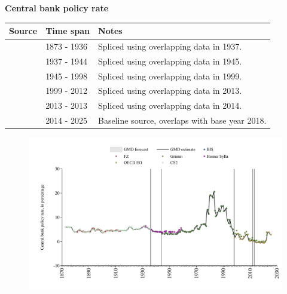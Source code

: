 \documentclass[12pt,a4paper,landscape]{article}
\begin{document}
\begin{adjustbox}{max totalsize={\paperwidth}{\paperheight},center}
\begin{minipage}[t][\textheight][t]{\textwidth}
\vspace*{0.5cm}
{}
\begin{center}
{\Large\bfseries Central bank policy rate}
\end{center}
\vspace{0.5cm}
\begin{table}[H]
\centering
\small
\begin{tabular}{|l|l|l|}
\hline
\textbf{Source} & \textbf{Time span} & \textbf{Notes} \\
\hline
\rowcolor{white}\cite{CS2_ESP}& 1873 - 1936 &Spliced using overlapping data in 1937. \\
\rowcolor{lightgray}\cite{Homer_Sylla}& 1937 - 1944 &Spliced using overlapping data in 1945. \\
\rowcolor{white}\cite{BIS}& 1945 - 1998 &Spliced using overlapping data in 1999. \\
\rowcolor{lightgray}\cite{OECD_EO}& 1999 - 2012 &Spliced using overlapping data in 2013. \\
\rowcolor{white}\cite{Grimm}& 2013 - 2013 &Spliced using overlapping data in 2014. \\
\rowcolor{lightgray}\cite{OECD_EO}& 2014 - 2025 &Baseline source, overlaps with base year 2018. \\
\hline
\end{tabular}
\end{table}
\begin{figure}[H]
\centering
\includegraphics[width=\textwidth,height=0.6\textheight,keepaspectratio]{graphs/ESP_cbrate.pdf}
\end{figure}
\end{minipage}
\end{adjustbox}
\end{document}
